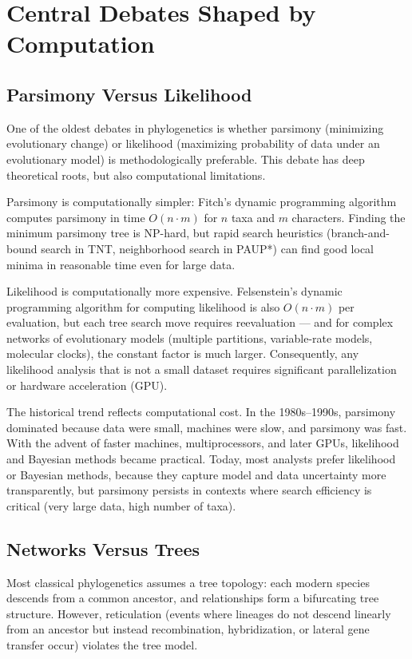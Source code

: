 \section{Central Debates Shaped by Computation}

\subsection{Parsimony Versus Likelihood}

One of the oldest debates in phylogenetics is whether parsimony (minimizing evolutionary change) or likelihood (maximizing probability of data under an evolutionary model) is methodologically preferable. This debate has deep theoretical roots, but also computational limitations.

Parsimony is computationally simpler: Fitch's dynamic programming algorithm \parencite{fitch1971} computes parsimony in time $O(n \cdot m)$ for $n$ taxa and $m$ characters. Finding the minimum parsimony tree is NP-hard, but rapid search heuristics (branch-and-bound search in TNT, neighborhood search in PAUP*) can find good local minima in reasonable time even for large data.

Likelihood is computationally more expensive. Felsenstein's dynamic programming algorithm for computing likelihood is also $O(n \cdot m)$ per evaluation, but each tree search move requires reevaluation --- and for complex networks of evolutionary models (multiple partitions, variable-rate models, molecular clocks), the constant factor is much larger. Consequently, any likelihood analysis that is not a small dataset requires significant parallelization or hardware acceleration (GPU).

The historical trend reflects computational cost. In the 1980s--1990s, parsimony dominated because data were small, machines were slow, and parsimony was fast. With the advent of faster machines, multiprocessors, and later GPUs, likelihood and Bayesian methods became practical. Today, most analysts prefer likelihood or Bayesian methods, because they capture model and data uncertainty more transparently, but parsimony persists in contexts where search efficiency is critical (very large data, high number of taxa).

\subsection{Networks Versus Trees}

Most classical phylogenetics assumes a tree topology: each modern species descends from a common ancestor, and relationships form a bifurcating tree structure. However, reticulation (events where lineages do not descend linearly from an ancestor but instead recombination, hybridization, or lateral gene transfer occur) violates the tree model.

